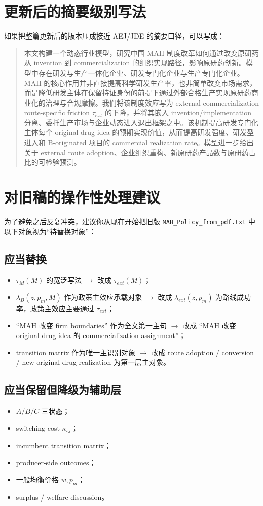 \documentclass[12pt,fontset=none]{ctexart}
\begin{document}
\section{更新后的摘要级别写法}

如果把整篇更新后的版本压成接近 AEJ/JDE 的摘要口径，可以写成：

\begin{quote}
本文构建一个动态行业模型，研究中国 MAH 制度改革如何通过改变原研药从 invention 到 commercialization 的组织实现路径，影响原研药创新。模型中存在研发与生产一体化企业、研发专门化企业与生产专门化企业。MAH 的核心作用并非直接提高科学研发生产率，也非简单改变市场需求，而是降低研发主体在保留持证身份的前提下通过外部合格生产实现原研药商业化的治理与合规摩擦。我们将该制度效应写为 external commercialization route-specific friction $\tau_{ext}$ 的下降，并将其嵌入 invention/implementation 分离、委托生产市场与企业动态进入退出框架之中。该机制提高研发专门化主体每个 original-drug idea 的预期实现价值，从而提高研发强度、研发型进入和 B-originated 项目的 commercial realization rate。模型进一步给出关于 external route adoption、企业组织重构、新原研药产品数与原研药占比的可检验预测。
\end{quote}

\section{对旧稿的操作性处理建议}

为了避免之后反复冲突，建议你从现在开始把旧版 \texttt{MAH\_Policy\_from\_pdf.txt} 中以下对象视为“待替换对象”：

\subsection{应当替换}
\begin{itemize}
    \item $\tau_M(M)$ 的宽泛写法 $\to$ 改成 $\tau_{ext}(M)$；
    \item $\lambda_B(z,p_m,M)$ 作为政策主效应承载对象 $\to$ 改成 $\lambda_{ext}(z,p_m)$ 为路线成功率，政策主效应主要通过 $\tau_{ext}$；
    \item “MAH 改变 firm boundaries” 作为全文第一主句 $\to$ 改成 “MAH 改变 original-drug idea 的 commercialization assignment”；
    \item transition matrix 作为唯一主识别对象 $\to$ 改成 route adoption / conversion / new original-drug realization 为第一层主对象。
\end{itemize}

\subsection{应当保留但降级为辅助层}
\begin{itemize}
    \item $A/B/C$ 三状态；
    \item switching cost $\kappa_{sj}$；
    \item incumbent transition matrix；
    \item producer-side outcomes；
    \item 一般均衡价格 $w,p_m$；
    \item surplus / welfare discussion。
\end{itemize}
\end{document}

